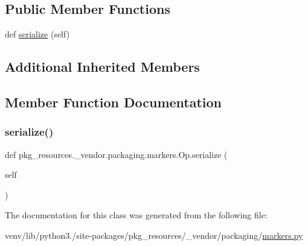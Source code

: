\subsection*{Public Member Functions}
\begin{DoxyCompactItemize}
\item 
def \hyperlink{classpkg__resources_1_1__vendor_1_1packaging_1_1markers_1_1Op_ae6e2b3e928ce015917574db2eef7061c}{serialize} (self)
\end{DoxyCompactItemize}
\subsection*{Additional Inherited Members}


\subsection{Member Function Documentation}
\mbox{\label{classpkg__resources_1_1__vendor_1_1packaging_1_1markers_1_1Op_ae6e2b3e928ce015917574db2eef7061c}} 
\subsubsection{\texorpdfstring{serialize()}{serialize()}}
{\footnotesize\ttfamily def pkg\+\_\+resources.\+\_\+vendor.\+packaging.\+markers.\+Op.\+serialize (\begin{DoxyParamCaption}\item[{}]{self }\end{DoxyParamCaption})}



The documentation for this class was generated from the following file\+:\begin{DoxyCompactItemize}
\item 
venv/lib/python3./site-\/packages/pkg\+\_\+resources/\+\_\+vendor/packaging/\hyperlink{pkg__resources_2__vendor_2packaging_2markers_8py}{markers.\+py}\end{DoxyCompactItemize}
